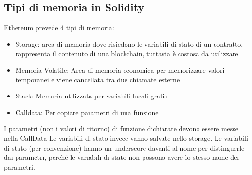 \documentclass[a4paper]{article}
\begin{document}
\subsection{Tipi di memoria in Solidity}

Ethereum prevede 4 tipi di memoria:
\begin{itemize}
    \item Storage: area di memoria dove risiedono le variabili di stato di un contratto, rappresenta il contenuto di una blockchain, tuttavia è costosa da utilizzare
    \item Memoria Volatile: Area di memoria economica per memorizzare valori temporanei e viene cancellata tra due chiamate esterne
    \item Stack: Memoria utilizzata per variabili locali gratis
    \item Calldata: Per copiare parametri di una funzione
\end{itemize}

I parametri (non i valori di ritorno) di funzione dichiarate devono essere messe nella CallData
Le variabili di stato invece vanno salvate nello storage.
Le variabili di stato (per convenzione) hanno un underscore davanti al nome per distinguerle dai parametri, perché le variabili di stato non possono avere lo stesso nome dei parametri.
\end{document}

